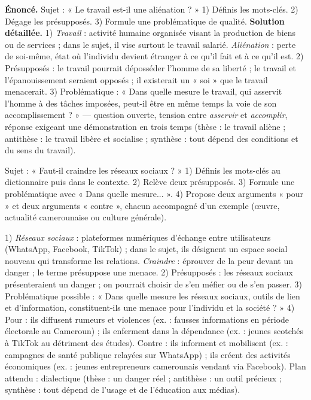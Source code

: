 \documentclass[11pt]{article}
\begin{document}
\begin{exoresolu}
\textbf{Énoncé.} Sujet : « Le travail est-il une aliénation ? » 1) Définis les mots-clés. 2) Dégage les présupposés. 3) Formule une problématique de qualité.
\tcblower
\textbf{Solution détaillée.}
1) \emph{Travail} : activité humaine organisée visant la production de biens ou de services ; dans le sujet, il vise surtout le travail salarié. \emph{Aliénation} : perte de soi-même, état où l'individu devient étranger à ce qu'il fait et à ce qu'il est.
2) Présupposés : le travail pourrait déposséder l'homme de sa liberté ; le travail et l'épanouissement seraient opposés ; il existerait un « soi » que le travail menacerait.
3) Problématique : « Dans quelle mesure le travail, qui asservit l'homme à des tâches imposées, peut-il être en même temps la voie de son accomplissement ? » — question ouverte, tension entre \emph{asservir} et \emph{accomplir}, réponse exigeant une démonstration en trois temps (thèse : le travail aliène ; antithèse : le travail libère et socialise ; synthèse : tout dépend des conditions et du sens du travail).
\end{exoresolu}

\begin{exercice}
Sujet : « Faut-il craindre les réseaux sociaux ? » 1) Définis les mots-clés au dictionnaire puis dans le contexte. 2) Relève deux présupposés. 3) Formule une problématique avec « Dans quelle mesure... ». 4) Propose deux arguments « pour » et deux arguments « contre », chacun accompagné d'un exemple (œuvre, actualité camerounaise ou culture générale).
\end{exercice}

\begin{corrige}[Exercice 1]
1) \emph{Réseaux sociaux} : plateformes numériques d'échange entre utilisateurs (WhatsApp, Facebook, TikTok) ; dans le sujet, ils désignent un espace social nouveau qui transforme les relations. \emph{Craindre} : éprouver de la peur devant un danger ; le terme présuppose une menace.
2) Présupposés : les réseaux sociaux présenteraient un danger ; on pourrait choisir de s'en méfier ou de s'en passer.
3) Problématique possible : « Dans quelle mesure les réseaux sociaux, outils de lien et d'information, constituent-ils une menace pour l'individu et la société ? »
4) Pour : ils diffusent rumeurs et violences (ex. : fausses informations en période électorale au Cameroun) ; ils enferment dans la dépendance (ex. : jeunes scotchés à TikTok au détriment des études). Contre : ils informent et mobilisent (ex. : campagnes de santé publique relayées sur WhatsApp) ; ils créent des activités économiques (ex. : jeunes entrepreneurs camerounais vendant via Facebook). Plan attendu : dialectique (thèse : un danger réel ; antithèse : un outil précieux ; synthèse : tout dépend de l'usage et de l'éducation aux médias).
\end{corrige}
\end{document}
